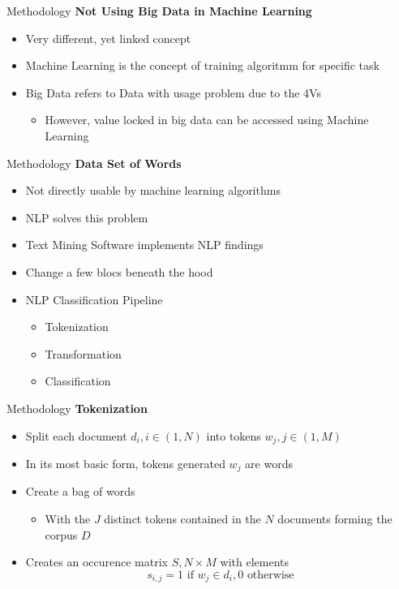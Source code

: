 \begin{frame}[label=metho]{Methodology}
	\textbf{Not Using Big Data in Machine Learning}
	\begin{itemize}
		\item Very different, yet linked concept
		\item Machine Learning is the concept of training algoritmm for specific task
		\item Big Data refers to Data with usage problem due to the 4Vs
		\begin{itemize}
			\item However, value locked in big data can be accessed using Machine Learning
		\end{itemize}	
	\end{itemize}
\end{frame}


\begin{frame}[label=metho]{Methodology}
	\textbf{Data Set of Words}
	\begin{itemize}
		\item Not directly usable by machine learning algorithms
		\item NLP solves this problem
		\item Text Mining Software implements NLP findings
		\item Change a few blocs beneath the hood
		\item NLP Classification Pipeline
		\begin{itemize}
			\item Tokenization
			\item Transformation
			\item Classification
		\end{itemize}	
	\end{itemize}
\end{frame}


\begin{frame}[label=metho]{Methodology}
	\textbf{Tokenization}
	\begin{itemize}
		\item Split each document $d_i, i \in(1, N)$ into tokens $w_j, j \in (1, M) $ 
		\item In its most basic form, tokens generated $w_j$ are words
		\item Create a bag of words
		\begin{itemize}
			\item With the $J$ distinct tokens contained in the $N$ documents forming the corpus $D$
		\end{itemize}
		\item Creates an occurence matrix $S, N \times M$ with elements
		$$ s_{i,j} = 1 \textrm{ if } w_j \in d_i, 0 \textrm{ otherwise}$$
	\end{itemize}
\end{frame}



